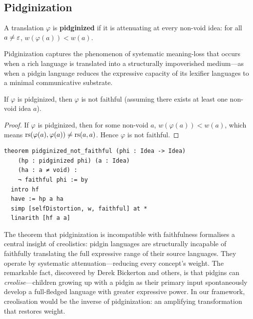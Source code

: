 \subsection{Pidginization}

\begin{definition}
\label{def:pidginized}
A translation $\varphi$ is \textbf{pidginized} if it is attenuating at
every non-void idea: for all $a \neq \varepsilon$,
$w(\varphi(a)) < w(a)$.
\end{definition}

Pidginization captures the phenomenon of systematic meaning-loss that
occurs when a rich language is translated into a structurally impoverished
medium---as when a pidgin language reduces the expressive capacity of
its lexifier languages to a minimal communicative substrate.

\begin{theorem}
\label{thm:pidginized-not-faithful}
If $\varphi$ is pidginized, then $\varphi$ is not faithful (assuming there
exists at least one non-void idea $a$).
\end{theorem}

\begin{proof}
If $\varphi$ is pidginized, then for some non-void $a$,
$w(\varphi(a)) < w(a)$, which means
$\mathrm{rs}(\varphi(a), \varphi(a)) \neq \mathrm{rs}(a, a)$.  Hence $\varphi$ is not
faithful.
\end{proof}

\begin{lstlisting}
theorem pidginized_not_faithful (phi : Idea -> Idea)
    (hp : pidginized phi) (a : Idea)
    (ha : a ≠ void) :
    ¬ faithful phi := by
  intro hf
  have := hp a ha
  simp [selfDistortion, w, faithful] at *
  linarith [hf a a]
\end{lstlisting}

\begin{interpretation}
\label{int:pidgin-creole}
The theorem that pidginization is incompatible with faithfulness formalises
a central insight of creolistics: pidgin languages are structurally incapable
of faithfully translating the full expressive range of their source
languages.  They operate by systematic attenuation---reducing every
concept's weight.  The remarkable fact, discovered by Derek Bickerton and
others, is that pidgins can \emph{creolise}---children growing up with a
pidgin as their primary input spontaneously develop a full-fledged language
with greater expressive power.  In our framework, creolisation would be the
inverse of pidginization: an amplifying transformation that restores weight.
\end{interpretation}

